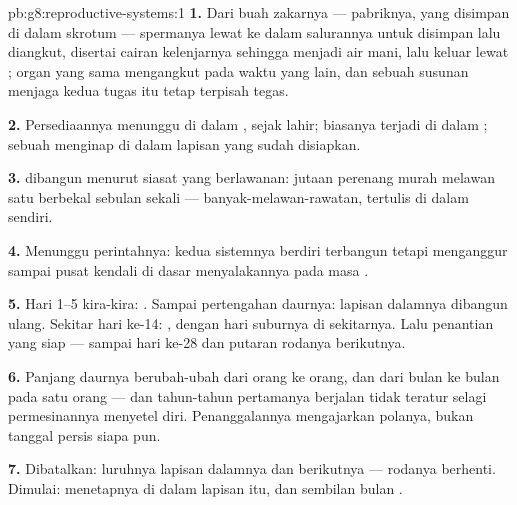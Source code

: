 \begin{solution}{pb:g8:reproductive-systems:1}
\textbf{1.} Dari buah zakarnya --- pabriknya, yang disimpan
di dalam skrotum --- spermanya lewat ke dalam salurannya
untuk disimpan lalu diangkut, disertai cairan kelenjarnya
sehingga menjadi air mani, lalu keluar lewat ; organ
yang sama mengangkut  pada waktu yang lain, dan sebuah
susunan  menjaga kedua tugas itu tetap terpisah tegas.

\textbf{2.} Persediaannya menunggu di dalam ,
sejak lahir;  biasanya terjadi di dalam ; sebuah  menginap di dalam lapisan 
yang sudah disiapkan.

\textbf{3.}  dibangun menurut siasat yang
berlawanan: jutaan perenang murah melawan satu  berbekal
sebulan sekali --- banyak-melawan-rawatan, tertulis di dalam
 sendiri.

\textbf{4.} Menunggu perintahnya: kedua sistemnya berdiri
terbangun tetapi menganggur sampai  pusat kendali di
dasar  menyalakannya pada masa .

\textbf{5.} Hari 1--5 kira-kira: . Sampai pertengahan
daurnya: lapisan dalamnya dibangun ulang. Sekitar hari ke-14:
, dengan hari suburnya di sekitarnya. Lalu penantian
yang siap --- sampai hari ke-28 dan putaran rodanya berikutnya.

\textbf{6.} Panjang daurnya berubah-ubah dari orang ke
orang, dan dari bulan ke bulan pada satu orang --- dan
tahun-tahun pertamanya berjalan tidak teratur selagi
permesinannya menyetel diri. Penanggalannya mengajarkan
polanya, bukan tanggal persis siapa pun.

\textbf{7.} Dibatalkan: luruhnya lapisan dalamnya dan 
berikutnya --- rodanya berhenti. Dimulai: menetapnya 
di dalam lapisan itu, dan sembilan bulan .


\end{solution}
